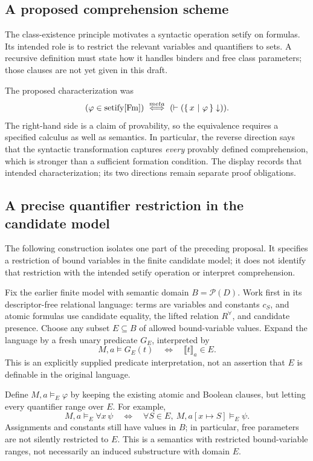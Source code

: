 \subsection{A proposed comprehension scheme}
The class-existence principle motivates a syntactic operation
$\mathrm{setify}$ on formulas. Its intended role is to restrict the relevant
variables and quantifiers to sets. A recursive definition must state how it
handles binders and free class parameters; those clauses are not yet given
in this draft.

The proposed characterization was
\[
(\varphi\in\mathrm{setify}[\mathrm{Fm}])
\stackrel{meta}{\ \Longleftrightarrow\ }
(\vdash (\left\{\,x\ \middle|\ \varphi\,\right\}\downarrow)).
\]
The right-hand side is a claim of provability, so the equivalence requires
a specified calculus as well as semantics. In particular, the reverse
direction says that the syntactic transformation captures \emph{every}
provably defined comprehension, which is stronger than a sufficient
formation condition. The display records that intended characterization;
its two directions remain separate proof obligations.

\subsection{A precise quantifier restriction in the candidate model}
The following construction isolates one part of the preceding proposal.
It specifies a restriction of bound variables in the finite candidate
model; it does not identify that restriction with the intended
$\mathrm{setify}$ operation or interpret comprehension.

Fix the earlier finite model with semantic domain $B=\mathcal P(D)$.
Work first in its descriptor-free relational language: terms are variables
and constants $c_S$, and atomic formulas use candidate equality, the
lifted relation $R^{\forall}$, and candidate presence. Choose any subset
$E\subseteq B$ of allowed bound-variable values. Expand the language
by a fresh unary predicate $G_E$, interpreted by
\[
M,a\vDash G_E(t)\quad\Longleftrightarrow\quad
\llbracket t\rrbracket_a\in E.
\]
This is an explicitly supplied predicate interpretation, not an assertion
that $E$ is definable in the original language.

Define $M,a\vDash_E\varphi$ by keeping the existing atomic and Boolean
clauses, but letting every quantifier range over $E$. For example,
\[
M,a\vDash_E\forall x\,\psi
\quad\Longleftrightarrow\quad
\forall S\in E,\ M,a[x\mapsto S]\vDash_E\psi.
\]
Assignments and constants still have values in $B$; in particular,
free parameters are not silently restricted to $E$. This is a semantics
with restricted bound-variable ranges, not necessarily an induced
substructure with domain $E$.

